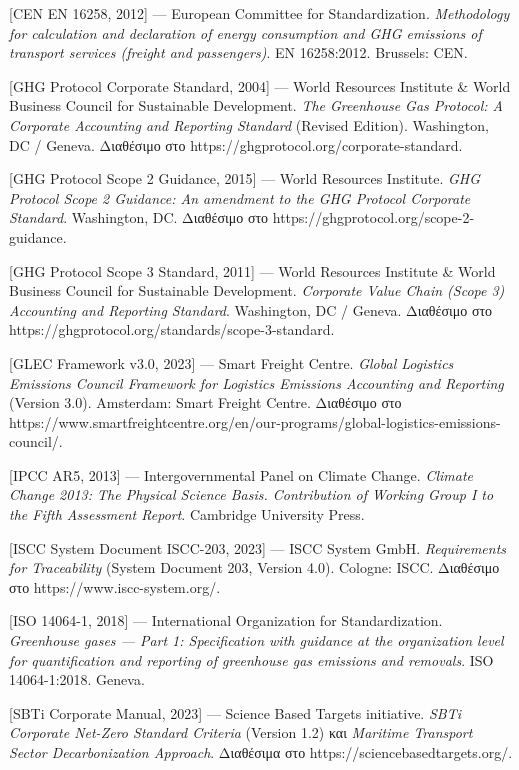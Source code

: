 {[}CEN EN 16258, 2012{]} --- European Committee for Standardization.
\emph{Methodology for calculation and declaration of energy consumption
and GHG emissions of transport services (freight and passengers)}. EN
16258:2012. Brussels: CEN.

{[}GHG Protocol Corporate Standard, 2004{]} --- World Resources
Institute \& World Business Council for Sustainable Development.
\emph{The Greenhouse Gas Protocol: A Corporate Accounting and Reporting
Standard} (Revised Edition). Washington, DC / Geneva. Διαθέσιμο στο
https://ghgprotocol.org/corporate-standard.

{[}GHG Protocol Scope 2 Guidance, 2015{]} --- World Resources Institute.
\emph{GHG Protocol Scope 2 Guidance: An amendment to the GHG Protocol
Corporate Standard}. Washington, DC. Διαθέσιμο στο
https://ghgprotocol.org/scope-2-guidance.

{[}GHG Protocol Scope 3 Standard, 2011{]} --- World Resources Institute
\& World Business Council for Sustainable Development. \emph{Corporate
Value Chain (Scope 3) Accounting and Reporting Standard}. Washington, DC
/ Geneva. Διαθέσιμο στο
https://ghgprotocol.org/standards/scope-3-standard.

{[}GLEC Framework v3.0, 2023{]} --- Smart Freight Centre. \emph{Global
Logistics Emissions Council Framework for Logistics Emissions Accounting
and Reporting} (Version 3.0). Amsterdam: Smart Freight Centre. Διαθέσιμο
στο
https://www.smartfreightcentre.org/en/our-programs/global-logistics-emissions-council/.

{[}IPCC AR5, 2013{]} --- Intergovernmental Panel on Climate Change.
\emph{Climate Change 2013: The Physical Science Basis. Contribution of
Working Group I to the Fifth Assessment Report}. Cambridge University
Press.

{[}ISCC System Document ISCC-203, 2023{]} --- ISCC System GmbH.
\emph{Requirements for Traceability} (System Document 203, Version 4.0).
Cologne: ISCC. Διαθέσιμο στο https://www.iscc-system.org/.

{[}ISO 14064-1, 2018{]} --- International Organization for
Standardization. \emph{Greenhouse gases --- Part 1: Specification with
guidance at the organization level for quantification and reporting of
greenhouse gas emissions and removals}. ISO 14064-1:2018. Geneva.

{[}SBTi Corporate Manual, 2023{]} --- Science Based Targets initiative.
\emph{SBTi Corporate Net-Zero Standard Criteria} (Version 1.2) και
\emph{Maritime Transport Sector Decarbonization Approach}. Διαθέσιμα στο
https://sciencebasedtargets.org/.

